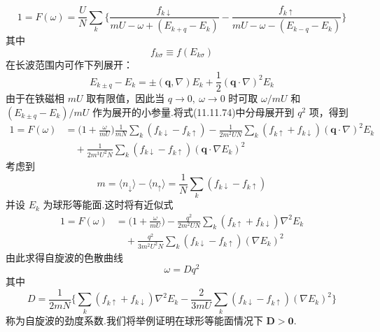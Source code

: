\begin{equation}
  1=F(\omega)=\frac{U}{N}\sum_{k}\biggl\{\frac{f_{k\downarrow}}{mU-\omega+(E_{k+q}-E_{k})}
  -\frac{f_{k\uparrow}}{mU-\omega-(E_{k-q}-E_{k})}\biggr\}
\end{equation}
其中
\begin{equation}
  f_{k\sigma}\equiv f(E_{k\sigma})
\end{equation}
在长波范围内可作下列展开：
\begin{equation}
  E_{k\pm q}-E_{k}=\pm(\boldsymbol{q},\nabla)E_{k}+\frac{1}{2}(\boldsymbol{q}\cdot\nabla)^{2}E_{k}
\end{equation}
由于在铁磁相 $mU$ 取有限值，因此当 $q\to 0,\ \omega\to 0$ 时可取 $\omega/mU$ 和 $(E_{k\pm q}-E_{k})/mU$ 作为展开的小参量.将式(11.11.74)中分母展开到 $q^{2}$ 项，得到
\begin{equation*}
\begin{aligned}
  1=F(\omega)&=\biggl(1+\frac{\omega}{mU}\biggr)\frac{1}{mN}\sum_{k}(f_{k\downarrow}-f_{k\uparrow})
  -\frac{1}{2m^{2}UN}\sum_{k}(f_{k\uparrow}+f_{k\downarrow})(\boldsymbol{q}\cdot\nabla)^{2}E_{k}\\
  &\quad+\frac{1}{2m^{3}U^{2}N}\sum_{k}(f_{k\downarrow}-f_{k\uparrow})(\boldsymbol{q}\cdot\nabla E_{k})^{2}
\end{aligned}
\end{equation*}
考虑到
\begin{equation*}
  m=\langle n_{\downarrow}\rangle-\langle n_{\uparrow}\rangle=\frac{1}{N}\sum_{k}(f_{k\downarrow}-f_{k\uparrow})
\end{equation*}
并设 $E_{k}$ 为球形等能面.这时将有近似式
\begin{equation}
\begin{aligned}
  1=F(\omega)&=\biggl(1+\frac{\omega}{mU}\biggr)-\frac{q^{2}}{2m^{2}UN}\sum_{k}(f_{k\uparrow}+f_{k\downarrow})\nabla^{2}E_{k}\\
  &\quad+\frac{q^{2}}{3m^{2}U^{2}N}\sum_{k}(f_{k\downarrow}-f_{k\uparrow})(\nabla E_{k})^{2}
\end{aligned}
\end{equation}
由此求得自旋波的色散曲线
\begin{equation}
  \omega=Dq^{2}
\end{equation}
其中
\begin{equation}
  D=\frac{1}{2mN}\biggl\{\sum_{k}(f_{k\uparrow}+f_{k\downarrow})\nabla^{2}E_{k}
  -\frac{2}{3mU}\sum_{k}(f_{k\downarrow}-f_{k\uparrow})(\nabla E_{k})^{2}\biggr\}
\end{equation}
称为自旋波的劲度系数.我们将举例证明在球形等能面情况下 $\boldsymbol{D}>\boldsymbol{0}$.

